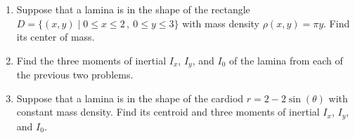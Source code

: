 \documentclass[12pt]{article}
\begin{document}
\begin{enumerate}
\item Suppose that a lamina is in the shape of the rectangle $D=\{(x,y)\mid 0\leq x\leq 2\,,\ 0\leq y\leq 3\}$ with mass density
  $\rho(x,y)=\pi y$.
  Find its center of mass.
\vspace{-2pt}
   

\item Find the three moments of inertial $I_x$, $I_y$, and $I_0$ \newline of the lamina from each of the previous two problems. 
\vspace{-2pt}
   


 \item   
  \begin{minipage}[t]{3.8in}
    Suppose that a lamina is in the shape of the cardiod  $r=2-2\sin(\theta)$ with constant mass density.
    Find its centroid and three moments of inertial $I_x$, $I_y$, and $I_0$.
  \end{minipage}
  \begin{minipage}[t]{110pt}
  \end{minipage}



\end{enumerate}
\end{document}

